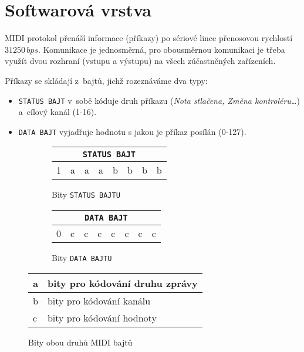 \section{Softwarová vrstva}\label{chpt:MIDIsw}

\acs{MIDI} protokol přenáší informace (příkazy) po sériové lince přenosovou rychlostí $31 250\,\unit{bps}$. Komunikace je jednosměrná, pro obousměrnou komunikaci je třeba využít dvou rozhraní (vstupu a výstupu) na všech zúčastněných zařízeních. %

Příkazy se skládají z~bajtů, jichž rozeznáváme dva typy:
\begin{itemize}
    \item \texttt{STATUS~BAJT} v~sobě kóduje druh příkazu (\emph{Nota stlačena, Změna kontroléru\ldots}) a~cílový kanál (1-16). 
    \item \texttt{DATA~BAJT} vyjadřuje hodnotu s jakou je příkaz posílán (0-127).
\end{itemize}

\begin{figure}[h]
    \centering
    \begin{subfigure}{.4\textwidth}
        \centering
        \begin{tabular}{|c|c|c|c|c|c|c|c|}
            \hline
            \multicolumn{8}{|c|}{\texttt{STATUS BAJT}} \\
            \hline
            1 & a & a & a & b & b & b & b \\ 
            \hline
        \end{tabular}
        \caption{Bity \texttt{STATUS BAJTU}}
        \label{fig:StByteBits}
    \end{subfigure}
    \begin{subfigure}{.4\textwidth}
        \centering
        \begin{tabular}{|c|c|c|c|c|c|c|c|}
            \hline
            \multicolumn{8}{|c|}{\texttt{DATA BAJT}} \\
            \hline
            0 & c & c & c & c & c & c & c \\ 
            \hline
        \end{tabular}
        \caption{Bity \texttt{DATA BAJTU}}
        \label{fig:DtByteBits}
    \end{subfigure}
    \begin{tabular}{l|l}
         a & bity pro kódování druhu zprávy  \\
         \hline
         b & bity pro kódování kanálu \\
         \hline
         c & bity pro kódování hodnoty 
    \end{tabular}
    \caption{Bity obou druhů \acs{MIDI} bajtů \cite{MIDIspecs}}
    \label{fig:MIDIbits}
    
\end{figure}

